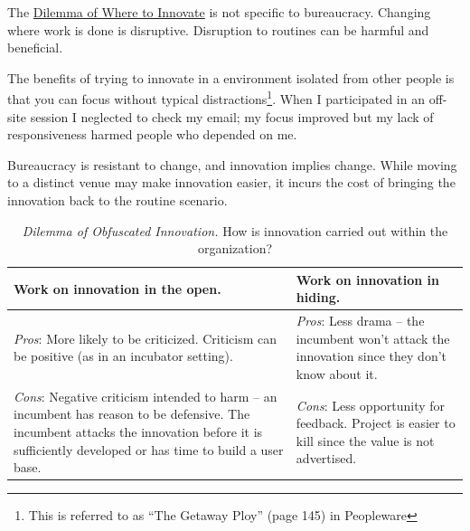 The \hyperref[table:dilemma-personal-where-to-innovate]{Dilemma of Where to Innovate} is not specific to bureaucracy. Changing where work is done is disruptive. Disruption to routines can be harmful and beneficial.

The benefits of trying to innovate in a environment isolated from other people is that you can focus without typical distractions\footnote{This is referred to as ``The Getaway Ploy'' (page 145) in Peopleware\cite{1987_DeMarco}}. When I participated in an off-site session I neglected to check my email; my focus improved but my lack of responsiveness harmed people who depended on me.

Bureaucracy is resistant to change, and innovation implies change. While moving to a distinct venue may make innovation easier, it incurs the cost of bringing the innovation back to the routine scenario.

\begin{center}
\begin{table}[H] %
\begin{tabular}{ | m{\dilemmatablewidth}| m{\dilemmatablewidth} | } 
  \hline
  \textbf{Work on innovation in the open.} &
  \textbf{Work on innovation in hiding.} \\
  \hline
  \textit{Pros}: More likely to be criticized. Criticism can be positive (as in an incubator setting).& 
  \textit{Pros}: Less drama -- the incumbent won't attack the innovation since they don't know about it. \\
  \hline
  \textit{Cons}: Negative criticism intended to harm -- an incumbent has reason to be defensive. The incumbent attacks the innovation before it is sufficiently developed or has time to build a user base. & 
  \textit{Cons}: Less opportunity for feedback. Project is easier to kill since the value is not advertised.\\
  \hline
\end{tabular}
\caption{
\textit{Dilemma of Obfuscated Innovation.}
How is innovation carried out within the organization?
}
\label{table:dilemma-personal-innovate-open-obscure}
\end{table}
\end{center}

